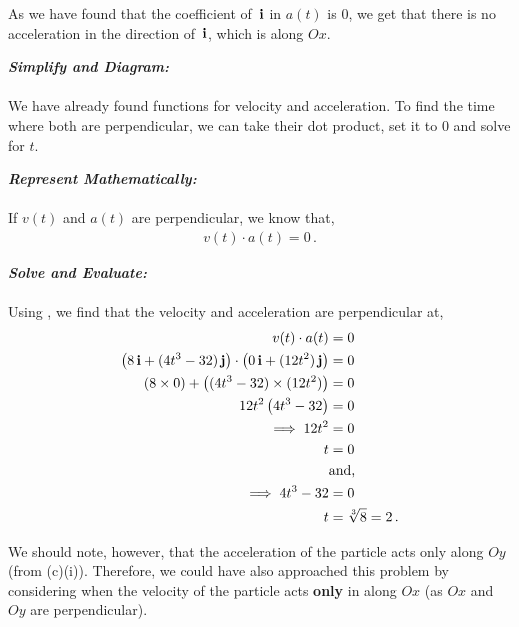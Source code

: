 \begin{subquestions}
\begin{subsubquestions}
As we have found that the coefficient of $\,\mathbf{i}$ in $a(t)$ is 0, we get that there is no acceleration in the direction of $\,\mathbf{i}$, which is along $Ox$. 


\subsubquestion

\textbf{\textit{Simplify and Diagram:}} \\ \\
We have already found functions for velocity and acceleration. To find the time where both are perpendicular, we can take their dot product, set it to 0 and solve for $t$.




\textbf{\textit{Represent Mathematically:}} \\ \\
If $v(t)$ and $a(t)$ are perpendicular, we know that,
\begin{align}
	v(t) \cdot a(t) = 0 \label{2009:q6:DotEqn} \,.
\end{align}



\textbf{\textit{Solve and Evaluate:}} \\ \\
Using , we find that the velocity and acceleration are perpendicular at,
\begin{align}
	v(t) \cdot a(t) & = 0 \nonumber \\
	\left(8\,\mathbf{i} + (4t^3-32)\,\mathbf{j}\right) \cdot \left(0\,\mathbf{i} + (12t^2)\,\mathbf{j} \right) & = 0 \nonumber \\
	\left(8 \times 0\right) + \left((4t^3-32) \times (12t^2)\right) & = 0 \nonumber \\
	12t^2\left(4t^3-32\right) & = 0 \nonumber \\
	\implies 12t^2 & = 0 \nonumber \\
	t & = 0 \\
	& \text{and,} \nonumber \\
	\implies 4t^3-32 & = 0 \nonumber \\
	t & = \sqrt[3]{8} = 2 \,.
\end{align}


We should note, however, that the acceleration of the particle acts only along $Oy$ (from (c)(i)). Therefore, we could have also approached this problem by considering when the velocity of the particle acts \textbf{only} in along $Ox$ (as $Ox$ and $Oy$ are perpendicular).


\end{subsubquestions}
\end{subquestions}
